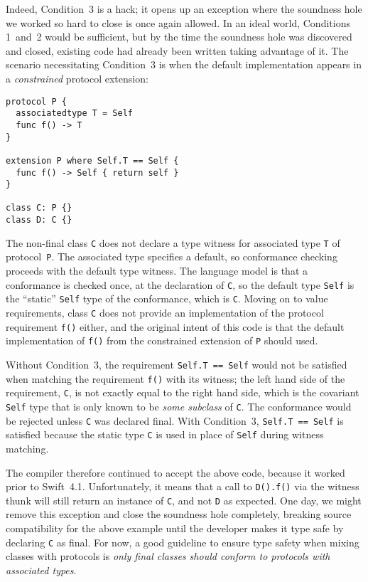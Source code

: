 \documentclass[a4paper,headsepline,bibliography=totoc,toc=flat,fleqn,twoside=semi]{scrbook}
\theoremstyle{definition}
\theoremstyle{definition}
\theoremstyle{definition}
\begin{document}
Indeed, Condition~3 is a hack; it opens up an exception where the soundness hole we worked so hard to close is once again allowed. In an ideal world, Conditions 1~and~2 would be sufficient, but by the time the soundness hole was discovered and closed, existing code had already been written taking advantage of it. The scenario necessitating Condition~3 is when the default implementation appears in a \emph{constrained} protocol extension:
\begin{Verbatim}
protocol P {
  associatedtype T = Self
  func f() -> T
}

extension P where Self.T == Self {
  func f() -> Self { return self }
}

class C: P {}
class D: C {}
\end{Verbatim}
The non-final class \texttt{C} does not declare a type witness for associated type \texttt{T} of protocol~\texttt{P}. The associated type specifies a default, so conformance checking proceeds with the default type witness. The language model is that a conformance is checked once, at the declaration of \texttt{C}, so the default type \texttt{Self} is the ``static'' \texttt{Self} type of the conformance, which is \texttt{C}. Moving on to value requirements, class \texttt{C} does not provide an implementation of the protocol requirement \texttt{f()} either, and the original intent of this code is that the default implementation of \texttt{f()} from the constrained extension of \texttt{P} should used.

Without Condition~3, the requirement \texttt{Self.T == Self} would not be satisfied when matching the requirement \texttt{f()} with its witness; the left hand side of the requirement, \texttt{C}, is not exactly equal to the right hand side, which is the covariant \texttt{Self} type that is only known to be \emph{some subclass} of \texttt{C}. The conformance would be rejected unless \texttt{C} was declared final. With Condition~3, \texttt{Self.T == Self} is satisfied because the static type \texttt{C} is used in place of \texttt{Self} during witness matching.

The compiler therefore continued to accept the above code, because it worked prior to Swift~4.1. Unfortunately, it means that a call to \texttt{D().f()} via the witness thunk will still return an instance of \texttt{C}, and not \texttt{D} as expected. One day, we might remove this exception and close the soundness hole completely, breaking source compatibility for the above example until the developer makes it type safe by declaring \texttt{C} as final. For now, a good guideline to ensure type safety when mixing classes with protocols is \textsl{only final classes should conform to protocols with associated types}.
\end{document}
